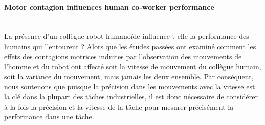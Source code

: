 

\paragraph*{\LARGE {Motor contagion influences human co-worker performance  \\}\\}

La présence d'un collègue robot humanoïde influence-t-elle la performance des humains qui l'entourent ? Alors que les études passées ont examiné comment les effets des contagions motrices induites par l'observation des mouvements de l'homme et du robot ont affecté soit la vitesse de mouvement du collègue humain, soit la variance du mouvement, mais jamais les deux ensemble. Par conséquent, nous soutenons que puisque la précision dans les mouvements avec la vitesse est la clé dans la plupart des tâches industrielles, il est donc nécessaire de considérer à la fois la précision et la vitesse de la tâche pour mesurer précisément la performance dans une tâche.





